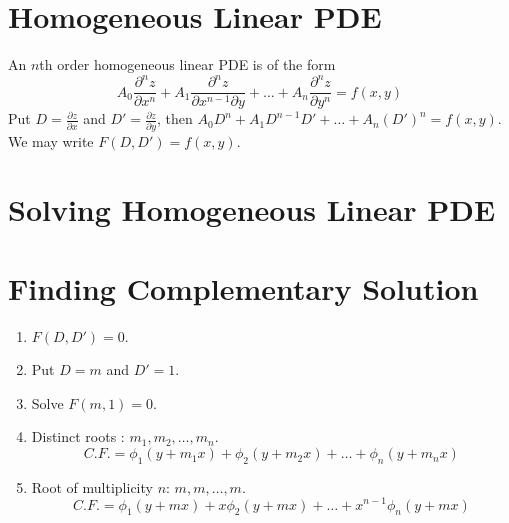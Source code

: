 \section{Homogeneous Linear PDE}

\begin{definition}
An $n$th order homogeneous linear PDE is of the form
$$A_0 \frac{\partial^n z}{\partial x^n} + A_1 \frac{\partial^n z}{\partial x^{n-1} \partial y} + \dots + A_n \frac{\partial^n z}{\partial y^n} = f(x,y)$$
Put $D = \frac{\partial z}{\partial x}$ and $D' = \frac{\partial z}{\partial y}$, then $A_0D^n + A_1D^{n-1}D' + \dots + A_n (D')^n = f(x,y)$. We may write $F(D,D') = f(x,y)$.
\end{definition}

\section{Solving Homogeneous Linear PDE}
\section{Finding Complementary Solution}
\begin{enumerate}
	\item $F(D,D') = 0$.
	\item Put $D = m$ and $D' =1$.
	\item Solve $F(m,1) = 0$.
	\item Distinct roots : $m_1,m_2,\dots,m_n$.
	$$C.F. = \phi_1(y+m_1x) + \phi_2(y+m_2x) + \dots + \phi_n(y+m_nx)$$
	\item Root of multiplicity $n$: $m,m,\dots,m$.
	$$C.F. = \phi_1(y+mx) + x\phi_2(y+mx) + \dots + x^{n-1}\phi_n(y+mx)$$
\end{enumerate}
